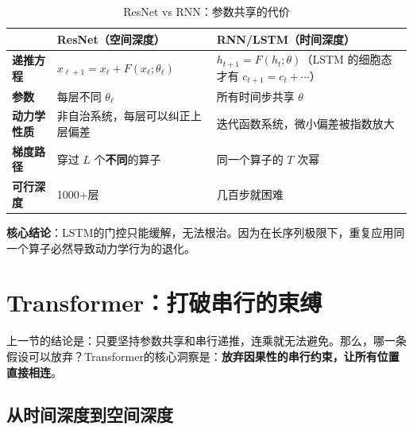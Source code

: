 \begin{table}[htbp]
\centering
\renewcommand{\arraystretch}{1.4}
\begin{tabularx}{\textwidth}{p{2.4cm}|X|X}
\toprule
& \textbf{ResNet（空间深度）} & \textbf{RNN/LSTM（时间深度）} \\
\midrule
\textbf{递推方程} & $x_{\ell+1} = x_\ell + F(x_\ell; \theta_\ell)$ & $h_{t+1} = F(h_t; \theta)$（LSTM 的细胞态才有 $c_{t+1} = c_t + \cdots$） \\
\midrule
\textbf{参数} & 每层不同 $\theta_\ell$ & 所有时间步共享 $\theta$ \\
\midrule
\textbf{动力学性质} & 非自治系统，每层可以纠正上层偏差 & 迭代函数系统，微小偏差被指数放大 \\
\midrule
\textbf{梯度路径} & 穿过 $L$ 个\textbf{不同}的算子 & 同一个算子的 $T$ 次幂 \\
\midrule
\textbf{可行深度} & 1000+层 & 几百步就困难 \\
\bottomrule
\end{tabularx}
\caption{ResNet vs RNN：参数共享的代价}
\end{table}

\textbf{核心结论}：LSTM的门控只能缓解，无法根治。因为在长序列极限下，重复应用同一个算子必然导致动力学行为的退化。


\section{Transformer：打破串行的束缚}


上一节的结论是：只要坚持参数共享和串行递推，连乘就无法避免。那么，哪一条假设可以放弃？Transformer的核心洞察是：\textbf{放弃因果性的串行约束，让所有位置直接相连}。

\subsection{从时间深度到空间深度}

